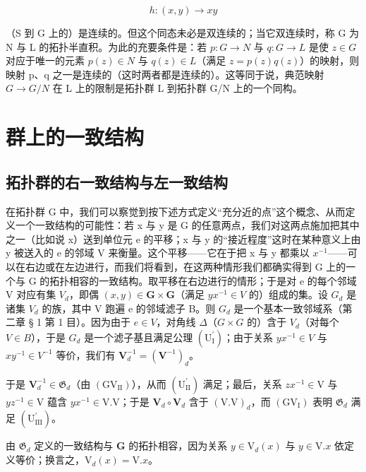 \[
h: (x, y) \rightarrow x y
\]

（S 到 G 上的）是连续的。但这个同态未必是双连续的；当它双连续时，称 G 为 N 与 L 的拓扑半直积。为此的充要条件是：若 \(p: G \to N\) 与 \(q: G \to L\) 是使 \(z \in G\) 对应于唯一的元素 \(p(z) \in N\) 与 \(q(z) \in L\)（满足 \(z = p(z)q(z)\)）的映射，则映射 p、q 之一是连续的（这时两者都是连续的）。这等同于说，典范映射 \(G \to G/N\) 在 L 上的限制是拓扑群 L 到拓扑群 G/N 上的一个同构。

\section{群上的一致结构}

\subsection{拓扑群的右一致结构与左一致结构}

在拓扑群 G 中，我们可以察觉到按下述方式定义“充分近的点”这个概念、从而定义一个一致结构的可能性：若 x 与 y 是 G 的任意两点，我们对这两点施加把其中之一（比如说 x）送到单位元 e 的平移；x 与 y 的“接近程度”这时在某种意义上由 y 被送入的 e 的邻域 V 来衡量。这个平移——它在于把 x 与 y 都乘以 \(x^{-1}\)——可以在右边或在左边进行，而我们将看到，在这两种情形我们都确实得到 G 上的一个与 G 的拓扑相容的一致结构。取平移在右边进行的情形；于是对 e 的每个邻域 V 对应有集 \(V_{d}\)，即偶 \((x, y) \in \mathbf{G} \times \mathbf{G}\)（满足 \(yx^{-1} \in V\) 的）组成的集。设 \(G_{d}\) 是诸集 \(V_{d}\) 的族，其中 V 跑遍 e 的邻域滤子 B。则 \(G_{d}\) 是一个基本一致邻域系（第二章 § 1 第 1 目）。因为由于 \(e \in V\)，对角线 \(\Delta\)（\(G \times G\) 的）含于 \(V_{d}\)（对每个 \(V \in B\)），于是 \(G_{d}\) 是一个滤子基且满足公理 \((\mathrm{U}_{\mathrm{I}}^{\prime})\)；由于关系 \(yx^{-1} \in V\) 与 \(xy^{-1} \in V^{-1}\) 等价，我们有 \(\mathbf{V}_{d}^{-1} = (\mathbf{V}^{-1})_{d}\)。

于是 \(\mathbf{V}_{d}^{-1}\in \mathfrak{G}_d\)（由 \((\mathrm{GV}_{\mathrm{II}})\)），从而 \((\mathrm{U}_{\mathrm{II}}^{\prime})\) 满足；最后，关系 \(zx^{-1}\in \mathrm{V}\) 与 \(yz^{-1}\in \mathrm{V}\) 蕴含 \(yx^{-1}\in \mathrm{V.V}\)；于是 \(\mathbf{V}_d\circ \mathbf{V}_d\) 含于 \((\mathrm{V.V})_d\)，而 \((\mathrm{GV}_{\mathrm{I}})\) 表明 \(\mathfrak{G}_d\) 满足 \((\mathrm{U}_{\mathrm{III}}^{\prime})\)。

由 \(\mathfrak{G}_d\) 定义的一致结构与 \(\mathbf{G}\) 的拓扑相容，因为关系 \(y \in \mathrm{V}_d(x)\) 与 \(y \in \mathrm{V}.x\) 依定义等价；换言之，\(\mathrm{V}_d(x) = \mathrm{V}.x\)。

